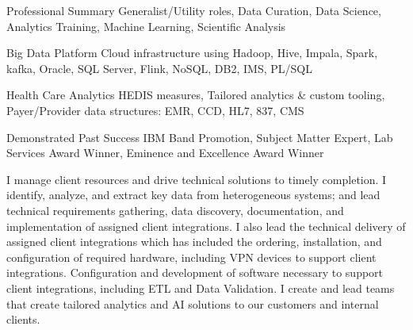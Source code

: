 

\begin{cvskills}

  \cvskill
    {Professional Summary} %
    {Generalist/Utility roles, Data Curation, Data Science, Analytics Training, Machine Learning, Scientific Analysis} %

  \cvskill
    {Big Data Platform} %
    {Cloud infrastructure using Hadoop, Hive, Impala, Spark, kafka, Oracle, SQL Server, Flink, NoSQL, DB2, IMS, PL/SQL} %

  \cvskill
    {Health Care Analytics} %
    {HEDIS measures, Tailored analytics \& custom tooling, Payer/Provider data structures: EMR, CCD, HL7, 837, CMS} %

  \cvskill
    {Demonstrated Past Success} %
    {IBM Band Promotion, Subject Matter Expert, Lab Services Award Winner, Eminence and Excellence Award Winner} %

\end{cvskills}

\begin{cvparagraph}
  I manage client resources and drive technical solutions to timely completion.  I identify, analyze, and extract key data from heterogeneous systems; and lead technical requirements gathering, data discovery, documentation, and implementation of assigned client integrations.  I also lead the technical delivery of assigned client integrations which has included the ordering, installation, and configuration of required hardware, including VPN devices to support client integrations.  Configuration and development of software necessary to support client integrations, including ETL and Data Validation.  I create and lead teams that create tailored analytics and AI solutions to our customers and internal clients.
\end{cvparagraph}
    
